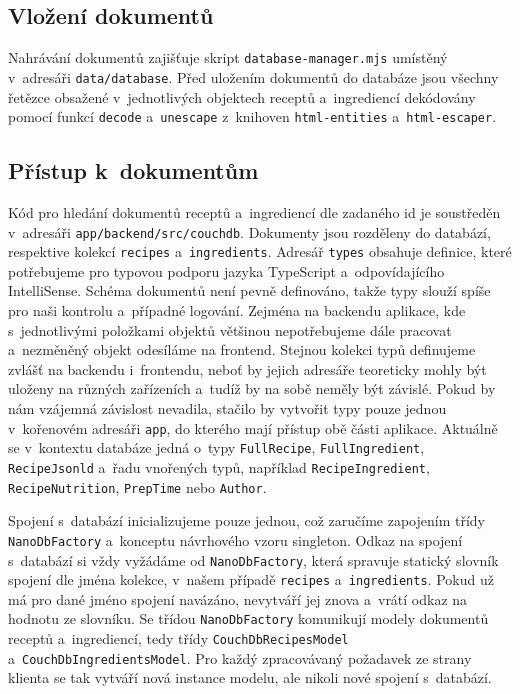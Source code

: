 \subsection{Vložení dokumentů}

Nahrávání dokumentů zajišťuje skript \texttt{database-manager.mjs} umístěný v~adresáři \texttt{data/database}. Před uložením dokumentů do databáze jsou všechny řetězce obsažené v~jednotlivých objektech receptů a~ingrediencí dekódovány pomocí funkcí \texttt{decode} a~\texttt{unescape} z~knihoven \texttt{html-entities} a~\texttt{html-escaper}.

\subsection{Přístup k~dokumentům}

Kód pro hledání dokumentů receptů a~ingrediencí dle zadaného id je soustředěn v~adresáři \texttt{app/backend/src/couchdb}. Dokumenty jsou rozděleny do databází, respektive kolekcí \texttt{recipes} a~\texttt{ingredients}. Adresář \texttt{types} obsahuje definice, které potřebujeme pro typovou podporu jazyka TypeScript a~odpovídajícího IntelliSense. Schéma dokumentů není pevně definováno, takže typy slouží spíše pro naši kontrolu a~případné logování. Zejména na backendu aplikace, kde s~jednotlivými položkami objektů většinou nepotřebujeme dále pracovat a~nezměněný objekt odesíláme na frontend. Stejnou kolekci typů definujeme zvlášť na backendu i~frontendu, neboť by jejich adresáře teoreticky mohly být uloženy na různých zařízeních a~tudíž by na sobě neměly být závislé. Pokud by nám vzájemná závislost nevadila, stačilo by vytvořit typy pouze jednou v~kořenovém adresáři \texttt{app}, do kterého mají přístup obě části aplikace. Aktuálně se v~kontextu databáze jedná o~typy \texttt{FullRecipe}, \texttt{FullIngredient}, \texttt{RecipeJsonld} a~řadu vnořených typů, například \texttt{RecipeIngredient}, \texttt{RecipeNutrition}, \texttt{PrepTime} nebo \texttt{Author}. 

Spojení s~databází inicializujeme pouze jednou, což zaručíme zapojením třídy \texttt{NanoDbFactory} a~konceptu návrhového vzoru singleton. Odkaz na spojení s~databází si vždy vyžádáme od \texttt{NanoDbFactory}, která spravuje statický slovník spojení dle jména kolekce, v~našem případě \texttt{recipes} a~\texttt{ingredients}. Pokud už má pro dané jméno spojení navázáno, nevytváří jej znova a~vrátí odkaz na hodnotu ze slovníku. Se třídou \texttt{NanoDbFactory} komunikují modely dokumentů receptů a~ingrediencí, tedy třídy \texttt{CouchDbRecipesModel} a~\texttt{CouchDbIngredientsModel}. Pro každý zpracovávaný požadavek ze strany klienta se tak vytváří nová instance modelu, ale nikoli nové spojení s~databází.

